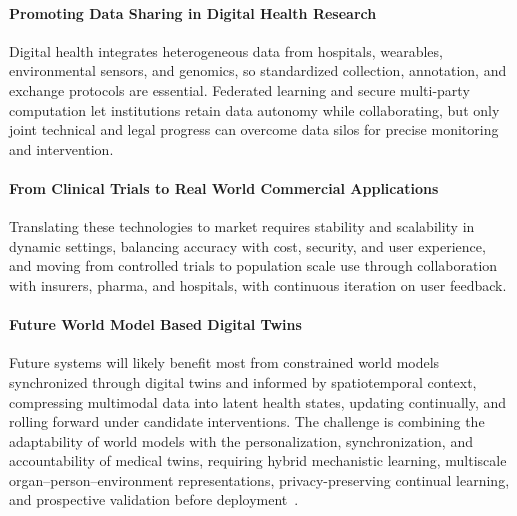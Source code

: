 \documentclass[journal]{IEEEtran}
\begin{document}
\paragraph{Promoting Data Sharing in Digital Health Research}
Digital health integrates heterogeneous data from hospitals, wearables, environmental sensors, and genomics, so standardized collection, annotation, and exchange protocols are essential. Federated learning and secure multi-party computation let institutions retain data autonomy while collaborating, but only joint technical and legal progress can overcome data silos for precise monitoring and intervention.

\paragraph{From Clinical Trials to Real World Commercial Applications}
Translating these technologies to market requires stability and scalability in dynamic settings, balancing accuracy with cost, security, and user experience, and moving from controlled trials to population scale use through collaboration with insurers, pharma, and hospitals, with continuous iteration on user feedback.

\paragraph{Future World Model Based Digital Twins}
Future systems will likely benefit most from constrained world models synchronized through digital twins and informed by spatiotemporal context, compressing multimodal data into latent health states, updating continually, and rolling forward under candidate interventions. The challenge is combining the adaptability of world models with the personalization, synchronization, and accountability of medical twins, requiring hybrid mechanistic learning, multiscale organ--person--environment representations, privacy-preserving continual learning, and prospective validation before deployment~\cite{DeDomenico2025ComplexSystems}.
\fi
\end{document}
